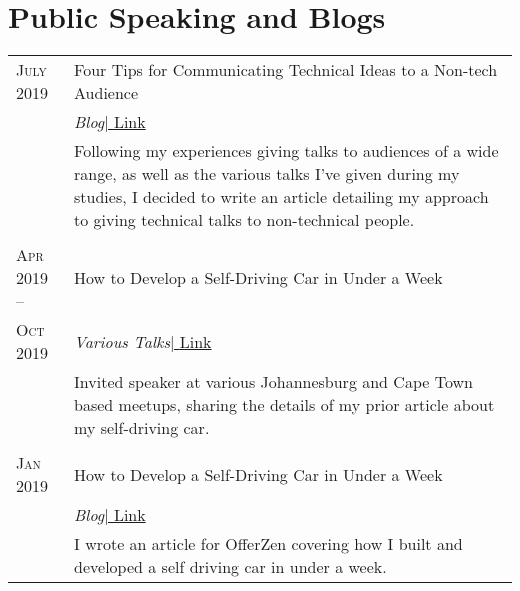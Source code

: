 \section{Public Speaking and Blogs}

\begin{supertabular}{p{1.8cm}|p{12cm}}
	\textsc{July} 2019 & Four Tips for Communicating Technical Ideas to a Non-tech Audience \\
	& \small\emph{Blog}\href{https://www.offerzen.com/blog/tips-communicating-tech-ideas-non-tech-audience}{\hfill| \footnotesize{Link}}\\
	& \footnotesize{Following my experiences giving talks to audiences of a wide range, as well as the various talks I've given during my studies, I decided to write an article detailing my approach to giving technical talks to non-technical people.} \\
	 \\
	\textsc{Apr} 2019 -- & How to Develop a Self-Driving Car in Under a Week \\
	\textsc{Oct} 2019 & \small\emph{Various Talks}\href{https://www.meetup.com/ArtificialIntelligenceZA/events/260285408/}{\hfill| \footnotesize{Link}}\\
	& \footnotesize{Invited speaker at various Johannesburg and Cape Town based meetups, sharing the details of my prior article about my self-driving car.} \\
	 \\
	\textsc{Jan} 2019 & How to Develop a Self-Driving Car in Under a Week \\
	& \small\emph{Blog}\href{https://www.offerzen.com/blog/how-to-develop-a-self-driving-car-in-under-a-week}{\hfill| \footnotesize{Link}}\\
	& \footnotesize{I wrote an article for OfferZen covering how I built and developed a self driving car in under a week.} \\
\end{supertabular}